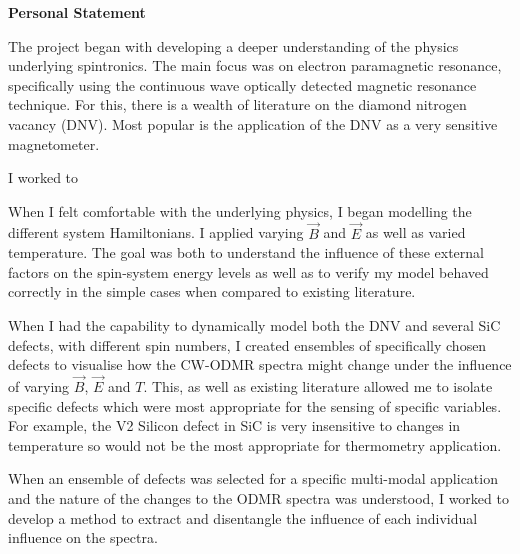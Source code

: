 \vspace*{\fill}
\begin{center}
\textrm{\bfseries\Huge Personal Statement}%
\end{center}%

\vspace{1em}



%
The project began with developing a deeper understanding of the physics underlying spintronics. 
The main focus was on electron paramagnetic resonance, specifically using the continuous wave optically detected magnetic resonance technique. For this, there is a wealth of literature on the diamond nitrogen vacancy (DNV). Most popular is the application of the DNV as a very sensitive magnetometer. 

I worked to  

When I felt comfortable with the underlying physics, I began modelling the different system Hamiltonians. I applied varying $\vec{B}$ and $\vec{E}$ as well as varied temperature. The goal was both to understand the influence of these external factors on the spin-system energy levels as well as to verify my model behaved correctly in the simple cases when compared to existing literature. 

When I had the capability to dynamically model both the DNV and several SiC defects, with different spin numbers, I created ensembles of specifically chosen defects to visualise how the CW-ODMR spectra might change under the influence of varying $\vec{B}$, $\vec{E}$ and $T$. This, as well as existing literature allowed me to isolate specific defects which were most appropriate for the sensing of specific variables. 
For example, the V2 Silicon defect in SiC is very insensitive to changes in temperature so would not be the most appropriate for thermometry application. 

When an ensemble of defects was selected for a specific multi-modal application and the nature of the changes to the ODMR spectra was understood, I worked to develop a method to extract and disentangle the influence of each individual influence on the spectra. 

